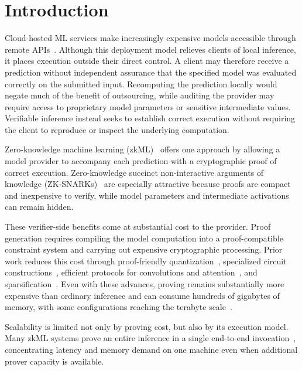 \section{Introduction}
\label{sec:intro}

Cloud-hosted ML services make increasingly expensive models accessible through remote APIs~\cite{zhang2019mark}. Although this deployment model relieves clients of local inference, it places execution outside their direct control. A client may therefore receive a prediction without independent assurance that the specified model was evaluated correctly on the submitted input. Recomputing the prediction locally would negate much of the benefit of outsourcing, while auditing the provider may require access to proprietary model parameters or sensitive intermediate values. Verifiable inference instead seeks to establish correct execution without requiring the client to reproduce or inspect the underlying computation.

Zero-knowledge machine learning (zkML)~\cite{chen2024zkml,kang2024scaling,liu2021zkcnn,boyuan2021zen,chen2025zktorch} offers one approach by allowing a model provider to accompany each prediction with a cryptographic proof of correct execution. Zero-knowledge succinct non-interactive arguments of knowledge (ZK-SNARKs)~\cite{bitansky2012extractable,kilian1992note,groth2016size} are especially attractive because proofs are compact and inexpensive to verify, while model parameters and intermediate activations can remain hidden.

These verifier-side benefits come at substantial cost to the provider. Proof generation requires compiling the model computation into a proof-compatible constraint system and carrying out expensive cryptographic processing. Prior work reduces this cost through proof-friendly quantization~\cite{boyuan2021zen}, specialized circuit constructions~\cite{kang2024scaling}, efficient protocols for convolutions and attention~\cite{liu2021zkcnn,sin2024zkllm}, and sparsification~\cite{maheri2025telesparse}. Even with these advances, proving remains substantially more expensive than ordinary inference and can consume hundreds of gigabytes of memory, with some configurations reaching the terabyte scale~\cite{chen2024zkml,maheri2025telesparse}.

Scalability is limited not only by proving cost, but also by its execution model. Many zkML systems prove an entire inference in a single end-to-end invocation~\cite{boyuan2021zen,kang2024scaling,liu2021zkcnn}, concentrating latency and memory demand on one machine even when additional prover capacity is available.

